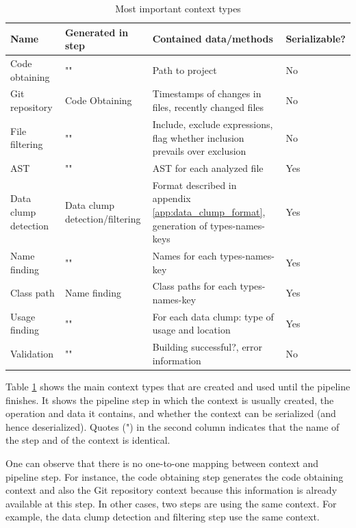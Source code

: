 \begin{table}[ht!]
    \centering
    \begin{tabular}{m{3cm}|m{2cm}|m{5cm}|m{2cm}}
        Name & Generated in step & Contained data/methods & Serializable?  \\\hline
        Code obtaining & "" & Path to project & No \\\hline
        Git repository & Code Obtaining & Timestamps of changes in files, recently changed files & No \\\hline
        File filtering & "" & Include, exclude expressions, flag whether inclusion prevails over exclusion & No \\\hline

        AST & "" & \ac{AST} for each analyzed file &  Yes \\\hline
         Data clump detection & Data clump detection/filtering  & Format described in appendix \ref{app:data_clump_format}, generation of types-names-keys & Yes \\\hline 
         Name finding & "" & Names for each types-names-key & Yes\\\hline

         Class path & Name finding & Class paths for each types-names-key & Yes\\\hline

         Usage finding & "" & For each data clump: type of usage and  location & Yes \\\hline

         Validation & "" & Building successful?, error information & No \\\hline
         
    \end{tabular}
    \caption{Most important context types}
    \label{tab:context_types}
\end{table}

Table \ref{tab:context_types} shows the main context types that are created and used until the pipeline finishes. It shows the pipeline step in which the context is usually created, the operation and data it contains, and whether the context can be serialized (and hence deserialized). Quotes (") in the second column indicates that the name of the step and of the context is identical. 

One can observe that there is no one-to-one mapping between context and pipeline step. For instance, the code obtaining step generates the code obtaining context and also the Git repository context because this information is already available at this step. In other cases, two steps are using the same context. For example, the data clump detection and filtering step use the same context.

